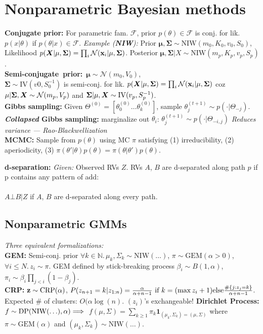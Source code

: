 \section*{Nonparametric Bayesian methods}
\textbf{Conjugate prior:} For parametric fam. $\mathcal{F}$, prior $p(\theta)\in\mathcal{F}$ is conj. for lik. $p(x|\theta)$ if $p(\theta|x)\in\mathcal{F}$.
\emph{Example (\textbf{NIW}):} Prior $\mathbf{\mu},\mathbf{\Sigma}\sim\mathrm{NIW}(m_0,K_0,v_0,S_0)$, Likelihood
$p({\bm{X}}|\mathbf{\mu},\mathbf{\Sigma}) = \prod_i \mathcal{N}({\mathbf{x}}_i|\mathbf{\mu},\mathbf{\Sigma})$.
Posterior $\mathbf{\mu},\mathbf{\Sigma}|X\sim\mathrm{NIW}(m_p,K_p,v_p,S_p)$.\\
\mbox{\textbf{Semi-conjugate prior:} $\mathbf{\mu}\sim\mathcal{N}(m_0,V_0)$,}\\$\mathbf{\Sigma}\sim\mathrm{IV}(v0,S_0^{-1})$ is semi-conj. for lik. $p({\bm{X}}|\mathbf{\mu},\mathbf{\Sigma}) = \prod_i \mathcal{N}({\mathbf{x}}_i|\mathbf{\mu},\mathbf{\Sigma})$ coz $\mathbf{\mu}|\mathbf{\Sigma},{\bm{X}}\sim\mathcal{N}(m_p,V_p)$ and $\mathbf{\Sigma}|\mathbf{\mu},{\bm{X}}\sim\mathrm{IV}(v_p,S_p^{-1})$.\\
\textbf{Gibbs sampling:} Given $\Theta^{(0)} = [\theta^{(0)}_0\ldots\theta^{(0)}_k]$, sample $\theta_j^{(t+1)}\sim p(\cdot|\Theta_{-j})$.\\
\textbf{\emph{Collapsed} Gibbs sampling:} marginalize out $\theta_i$: $\theta_j^{(t+1)}\sim p(\cdot|\Theta_{-i,j})$ \emph{Reduces variance --- Rao-Blackwellization}\\
\textbf{MCMC:} Sample from $p(\theta)$ using MC $\pi$ satisfying
(1) irreducibility, (2) aperiodicity, (3) $\pi(\theta'|\theta)p(\theta) = \pi(\theta|\theta')p(\theta)$.

\textbf{d-separation:} \emph{Given:} Observed RVs $Z$.
RVs $A$, $B$ are d-separated along path $p$ if p contains
any pattern of {\color{red}add}:\\\\

$A \bot B | Z$ if $A$, $B$ are d-separated along every path.

\subsection*{Nonparametric GMMs}
\emph{Three equivalent formalizations:}\\
\textbf{GEM:} Semi-conj. prior $\forall k\in\mathbb{N}.\,\mu_k,\Sigma_k\sim\mathrm{NIW}(\ldots)$, $\pi\sim\mathrm{GEM}(\alpha > 0)$, $\forall i\leq N.\,z_i\sim\pi$.
GEM defined by stick-breaking process $\beta_i\sim B(1,\alpha)$, $\pi_i\sim\beta_i\prod_{j<i}(1-\beta_j)$.\\
\textbf{CRP:} ${\mathbf{z}}\sim\mathrm{CRP}(\alpha)$, $P(z_{n+1}=k|z_{1:n})= \frac{\alpha}{\alpha+n-1} {\color{black}\textrm{ if }} k=(\max z_i+1) {\color{black}\mathrm{ else }} \frac{\#\{j:z_j=k\}}{\alpha+n-1}$. Expected \# of clusters: $O(\alpha\log(n)$. $(z_i)$'s exchangeable! 
\textbf{Dirichlet Process:} $f\sim\mathrm{DP}(\mathrm{NIW}(\ldots),\alpha) {\color{black}\implies} $
$f(\mu,\Sigma)=\sum_{k\geq1}\pi_k\mathbf{1}_{(\mu_k,\Sigma_k)=(\mu,\Sigma)}$ where $\pi\sim\mathrm{GEM}(\alpha)$ and $(\mu_k,\Sigma_k)\sim\mathrm{NIW}(\ldots)$.